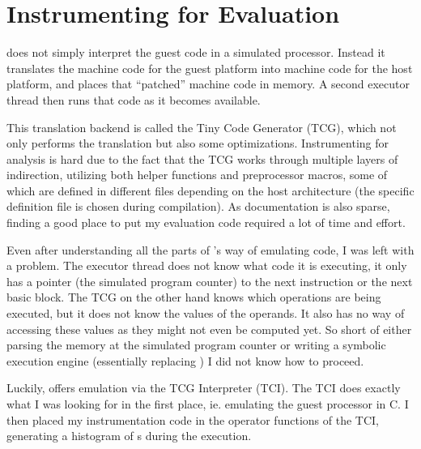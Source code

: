 \section{Instrumenting \qemu{} for Evaluation}
\label{evaluation}
\qemu{} does not simply interpret the guest code in a simulated processor.
Instead it translates the machine code for the guest platform into machine code for the host platform, and places that ``patched'' machine code in memory.
A second executor thread then runs that code as it becomes available.

This translation backend is called the Tiny Code Generator (TCG), which not only performs the translation but also some optimizations.
Instrumenting \qemu{} for analysis is hard due to the fact that the TCG works through multiple layers of indirection, utilizing both helper functions and preprocessor macros, some of which are defined in different files depending on the host architecture (the specific definition file is chosen during compilation).
As documentation is also sparse, finding a good place to put my evaluation code required a lot of time and effort.

Even after understanding all the parts of \qemu{}'s way of emulating code, I was left with a problem.
The executor thread does not know what code it is executing, it only has a pointer (the simulated program counter) to the next instruction or the next basic block.
The TCG on the other hand knows which operations are being executed, but it does not know the values of the operands.
It also has no way of accessing these values as they might not even be computed yet.
So short of either parsing the memory at the simulated program counter or writing a symbolic execution engine (essentially replacing \qemu{}) I did not know how to proceed.

Luckily, \qemu{} offers emulation via the TCG Interpreter (TCI).
The TCI does exactly what I was looking for in the first place, ie. emulating the guest processor in C.
I then placed my instrumentation code in the operator functions of the TCI, generating a histogram of \hammingw{}s during the execution.
